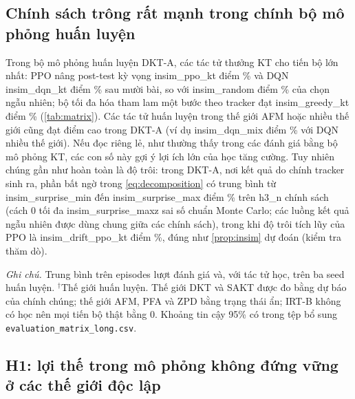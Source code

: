 \subsection{Chính sách trông rất mạnh trong chính bộ mô phỏng huấn luyện}\label{sec:res-insim}

Trong bộ mô phỏng huấn luyện DKT-A, các tác tử thưởng KT cho tiến bộ lớn nhất: PPO nâng post-test kỳ vọng {{insim_ppo_kt}} điểm \% và DQN {{insim_dqn_kt}} điểm \% sau mười bài, so với {{insim_random}} điểm \% của chọn ngẫu nhiên; bộ tối đa hóa tham lam một bước theo tracker đạt {{insim_greedy_kt}} điểm \% (\cref{tab:matrix}). Các tác tử huấn luyện trong thế giới AFM hoặc nhiều thế giới cũng đạt điểm cao trong DKT-A (ví dụ {{insim_dqn_mix}} điểm \% với DQN nhiều thế giới). Nếu đọc riêng lẻ, như thường thấy trong các đánh giá bằng bộ mô phỏng KT, các con số này gợi ý lợi ích lớn của học tăng cường. Tuy nhiên chúng gần như hoàn toàn là độ trôi: trong DKT-A, nơi kết quả do chính tracker sinh ra, phần bất ngờ trong \eqref{eq:decomposition} có trung bình từ {{insim_surprise_min}} đến {{insim_surprise_max}} điểm \% trên {{h3_n}} chính sách (cách 0 tối đa {{insim_surprise_maxz}} sai số chuẩn Monte Carlo; các luồng kết quả ngẫu nhiên được dùng chung giữa các chính sách), trong khi độ trôi tích lũy của PPO là {{insim_drift_ppo_kt}} điểm \%, đúng như \cref{prop:insim} dự đoán (kiểm tra thăm dò).

\begin{table}[t]
\centering
\caption{Tiến bộ post-test do thế giới đo (điểm \% sau mười bài) của mọi chính sách trong mọi thế giới đánh giá.}
\label{tab:matrix}
\footnotesize
{}
\par\smallskip
\begin{minipage}{\textwidth}\footnotesize
\textit{Ghi chú.} Trung bình trên {{episodes}} lượt đánh giá và, với tác tử học, trên ba seed huấn luyện. $^\dagger$Thế giới huấn luyện. Thế giới DKT và SAKT được đo bằng dự báo của chính chúng; thế giới AFM, PFA và ZPD bằng trạng thái ẩn; IRT-B không có học nên mọi tiến bộ thật bằng 0. Khoảng tin cậy 95\% có trong tệp bổ sung \texttt{evaluation\_matrix\_long.csv}.
\end{minipage}
\end{table}

\subsection{H1: lợi thế trong mô phỏng không đứng vững ở các thế giới độc lập}\label{sec:res-h1}

